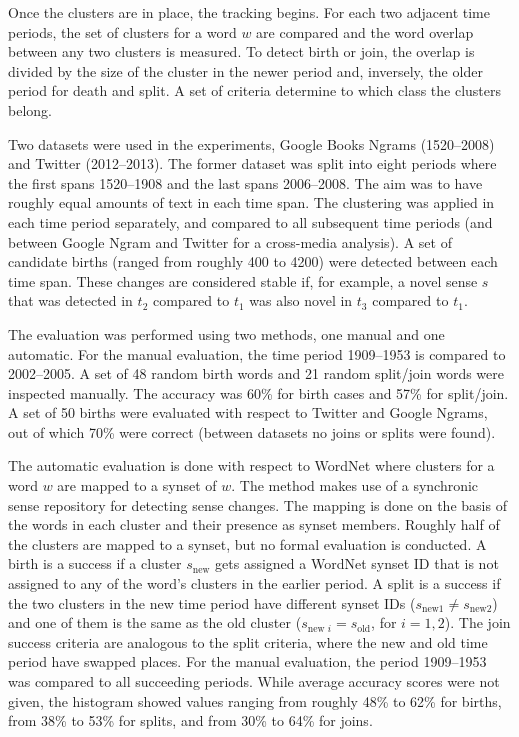 \documentclass[output=paper]{langsci/langscibook}
\begin{document}
Once the clusters are in place, the tracking begins. For each two adjacent time periods, the set of clusters for a word $w$ are compared and the word overlap between any two clusters is measured. To detect birth or join, the overlap is divided by the size of the cluster in the newer period and, inversely, the older period for death and split. A set of criteria determine to which class the clusters belong. 

Two datasets were used in the experiments, Google Books Ngrams (1520--2008) and Twitter (2012--2013). The former dataset was split into eight periods where the first spans 1520--1908 and the last spans 2006--2008. The aim was to have roughly equal amounts of text in each time span. 
The clustering was applied in each time period separately, and compared to all subsequent time periods (and between Google Ngram and Twitter for a cross-media analysis). 
A set of candidate births (ranged from roughly 400 to 4200) were detected between each time span. These changes are considered stable if, for example, a novel sense $s$ that was detected in $t_2$ compared to $t_1$ was also novel in $t_3$ compared to $t_1$. 

The evaluation was performed using two methods, one manual and one automatic. For the manual evaluation, the time period 1909--1953 is compared to 2002--2005. A set of 48 random birth words and 21 random split/join words were inspected manually. The accuracy was 60\% for birth cases and 57\% for split/join.   A set of 50 births were evaluated with respect to Twitter and Google Ngrams, out of which 70\% were correct (between datasets no joins or splits were found). 

The automatic evaluation is done with respect to WordNet where clusters for a word $w$ are mapped to a synset of $w$. The method makes use of a synchronic sense repository for detecting sense changes. The mapping is done on the basis of the words in each cluster and their presence as synset members. Roughly half of the clusters are mapped to a synset, but no formal evaluation is conducted. A birth is a success if a cluster $s_{\text{new}}$ gets assigned a WordNet synset ID that is not assigned to any of the word's clusters in the earlier period. A split is a success if the two clusters in the new time period  have different synset IDs ($s_{\text{new1}} \neq s_{\text{new2}} $) and one of them is the same as the old cluster ($s_{\text{new }i} = s_{\text{old}}$, for $i=1,2$). The join success criteria are analogous to the split criteria, where the new and old time period have swapped places. For the manual evaluation, the period 1909--1953 was compared to all succeeding periods. While average accuracy scores were not given, the histogram showed values ranging from roughly 48\% to 62\% for births, from 38\% to 53\% for splits, and from 30\% to 64\% for joins. 
\end{document}
